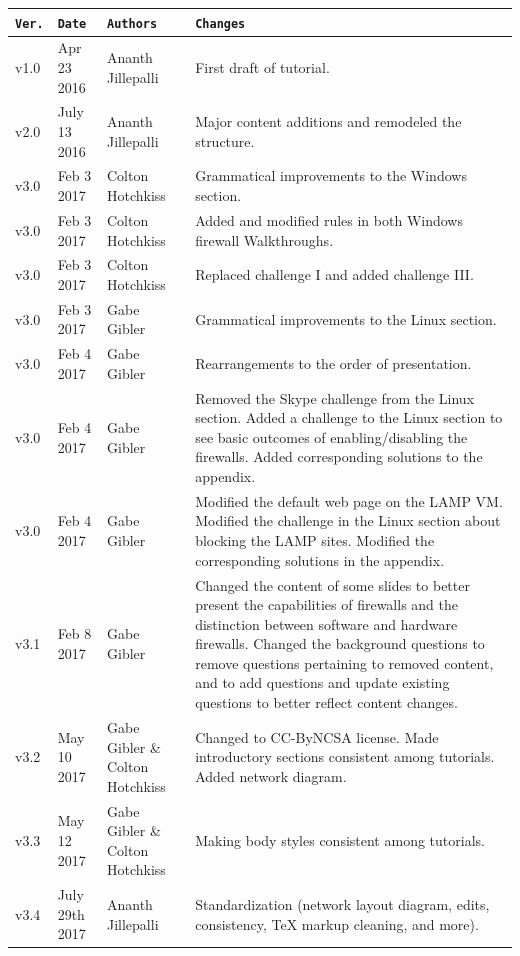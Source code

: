 \documentclass[12pt]{extarticle}
\begin{document}
{
\begin{tabular}{ |p{1cm}|p{3cm}|p{4cm}|p{7cm}|  }
	\hline
	\texttt{\textbf{Ver.}} & \texttt{\textbf{Date}} & \texttt{\textbf{Authors}} & \texttt{\textbf{Changes}} \\
	\hline
	v1.0 & Apr 23 2016 & Ananth Jillepalli & First draft of tutorial. \\
	\hline
	v2.0 & July 13 2016 & Ananth Jillepalli & Major content additions and remodeled the structure. \\
	\hline
	v3.0 & Feb 3 2017 & Colton Hotchkiss & Grammatical improvements to the Windows section. \\
	\hline
	v3.0 & Feb 3 2017 & Colton Hotchkiss & Added and modified rules in both Windows firewall Walkthroughs. \\
	\hline
	v3.0 & Feb 3 2017 & Colton Hotchkiss & Replaced challenge I and added challenge III. \\
	\hline
	v3.0 & Feb 3 2017 & Gabe Gibler & Grammatical improvements to the Linux section. \\
	\hline
	v3.0 & Feb 4 2017 & Gabe Gibler & Rearrangements to the order of presentation. \\
	\hline
	v3.0 & Feb 4 2017 & Gabe Gibler & Removed the Skype challenge from the Linux section. Added a challenge to the Linux section to see basic outcomes of enabling/disabling the firewalls. Added corresponding solutions to the appendix. \\
	\hline
	v3.0 & Feb 4 2017 & Gabe Gibler & Modified the default web page on the LAMP VM. Modified the challenge in the Linux section about blocking the LAMP sites. Modified the corresponding solutions in the appendix. \\
	\hline
	v3.1 & Feb 8 2017 & Gabe Gibler & Changed the content of some slides to better present the capabilities of firewalls and the distinction between software and hardware firewalls. Changed the background questions to remove questions pertaining to removed content, and to add questions and update existing questions to better reflect content changes. \\
	\hline
	v3.2 & May 10 2017 & Gabe Gibler \& Colton Hotchkiss & Changed to CC-ByNCSA license. Made introductory sections consistent among tutorials. Added network diagram. \\
	\hline
	v3.3 & May 12 2017 & Gabe Gibler \& Colton Hotchkiss & Making body styles consistent among tutorials. \\
	\hline
	v3.4 & July 29th 2017 & Ananth Jillepalli & Standardization (network layout diagram, edits, consistency, TeX markup cleaning, and more). \\
	\hline
\end{tabular}
}
	
	





\pagebreak

	
\end{document}

